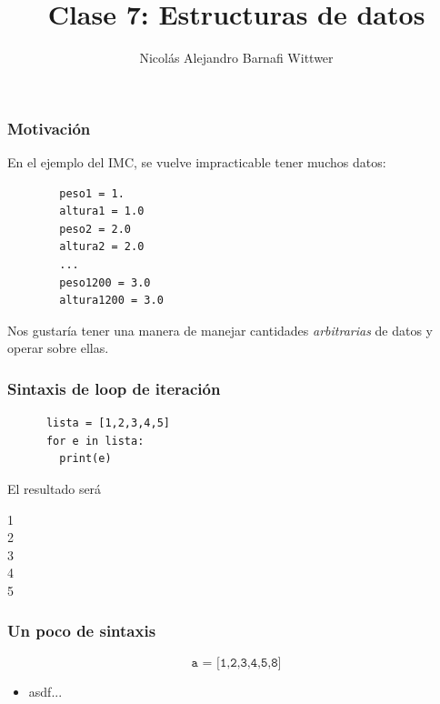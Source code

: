 \documentclass[14pt,aspectratio=169,xcolor=dvipsnames]{beamer}
\title[short title]{Clase 7: Estructuras de datos}
\subtitle{}
\author[NA Barnafi] {Nicolás Alejandro Barnafi Wittwer}
\institute[UC|CMM] 
{
    Pontificia Universidad Católica de Chile \\
    Centro de Modelamiento Matemático
}
\begin{document}
\begin{frame}
    \maketitle
\end{frame}
\begin{frame}[fragile]\frametitle{Motivación}
En el ejemplo del IMC, se vuelve impracticable tener muchos datos:
    \begin{verbatim}
        peso1 = 1.
        altura1 = 1.0
        peso2 = 2.0 
        altura2 = 2.0
        ...
        peso1200 = 3.0
        altura1200 = 3.0
    \end{verbatim}

Nos gustaría tener una manera de manejar cantidades \emph{arbitrarias} de datos y operar sobre ellas.
\end{frame}
\begin{frame}[fragile]\frametitle{Sintaxis de loop de iteración}
    \begin{verbatim}
      lista = [1,2,3,4,5]
      for e in lista:
        print(e)
    \end{verbatim}
\pause El resultado será

1\\
2\\
3\\
4\\
5
\end{frame}
\begin{frame}\frametitle{Un poco de sintaxis}
    $$ \texttt{a = [1,2,3,4,5,8]} $$
    \begin{itemize}
        \item asdf...
    \end{itemize}
\end{frame}
\begin{frame}
    \maketitle
\end{frame}
\end{document}
